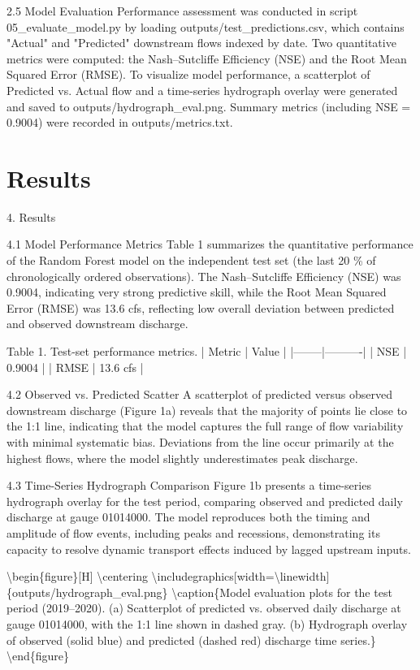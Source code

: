 \documentclass[preprint,12pt]{elsarticle}
\begin{document}
2.5 Model Evaluation  
Performance assessment was conducted in script 05\_evaluate\_model.py by loading outputs/test\_predictions.csv, which contains "Actual" and "Predicted" downstream flows indexed by date. Two quantitative metrics were computed: the Nash–Sutcliffe Efficiency (NSE) and the Root Mean Squared Error (RMSE). To visualize model performance, a scatterplot of Predicted vs. Actual flow and a time‐series hydrograph overlay were generated and saved to outputs/hydrograph\_eval.png. Summary metrics (including NSE = 0.9004) were recorded in outputs/metrics.txt.


\section{Results}

4. Results

4.1 Model Performance Metrics  
Table 1 summarizes the quantitative performance of the Random Forest model on the independent test set (the last 20 \% of chronologically ordered observations). The Nash–Sutcliffe Efficiency (NSE) was 0.9004, indicating very strong predictive skill, while the Root Mean Squared Error (RMSE) was 13.6 cfs, reflecting low overall deviation between predicted and observed downstream discharge.

Table 1. Test-set performance metrics.  
| Metric | Value    |
|--------|----------|
| NSE    | 0.9004   |
| RMSE   | 13.6 cfs |

4.2 Observed vs. Predicted Scatter  
A scatterplot of predicted versus observed downstream discharge (Figure 1a) reveals that the majority of points lie close to the 1:1 line, indicating that the model captures the full range of flow variability with minimal systematic bias. Deviations from the line occur primarily at the highest flows, where the model slightly underestimates peak discharge.

4.3 Time-Series Hydrograph Comparison  
Figure 1b presents a time-series hydrograph overlay for the test period, comparing observed and predicted daily discharge at gauge 01014000. The model reproduces both the timing and amplitude of flow events, including peaks and recessions, demonstrating its capacity to resolve dynamic transport effects induced by lagged upstream inputs.

\textbackslash{}begin\{figure\}[H]
    \textbackslash{}centering
    \textbackslash{}includegraphics[width=\textbackslash{}linewidth]\{outputs/hydrograph\_eval.png\}
    \textbackslash{}caption\{Model evaluation plots for the test period (2019–2020). (a) Scatterplot of predicted vs. observed daily discharge at gauge 01014000, with the 1:1 line shown in dashed gray. (b) Hydrograph overlay of observed (solid blue) and predicted (dashed red) discharge time series.\}
\textbackslash{}end\{figure\}
\end{document}
